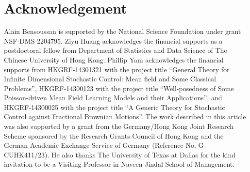 \documentclass[11pt]{article}
\numberwithin{equation}{section}
\newcommand{\1}{\mbox{1\hspace{-1mm}I}}
\begin{document}
\section*{Acknowledgement}

Alain Bensoussan is supported by the National Science Foundation under grant NSF-DMS-2204795. Ziyu Huang acknowledges the financial supports as a postdoctoral fellow from Department of Statistics and Data Science of The Chinese University of Hong Kong. Phillip Yam acknowledges the financial supports from HKGRF-14301321 with the project title ``General Theory for Infinite Dimensional Stochastic Control: Mean field and Some Classical Problems'', HKGRF-14300123 with the project title ``Well-posedness of Some Poisson-driven Mean Field Learning Models and their Applications'', and HKGRF-14300025 with the project title ``A Generic Theory for Stochastic Control against Fractional Brownian Motions''. The work described in this article was also supported by a grant from the Germany/Hong Kong Joint Research Scheme sponsored by the Research Grants Council of Hong Kong and the German Academic Exchange Service of Germany (Reference No. G-CUHK411/23). He also thanks The University of Texas at Dallas for the kind invitation to be a Visiting Professor in Naveen Jindal School of Management.


\footnotesize
{}
\end{document}
